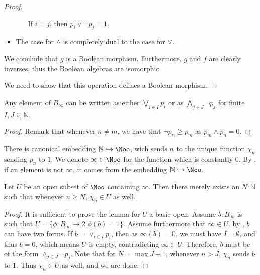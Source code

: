 \begin{proof}
\begin{itemize}
\begin{itemize}
        If $i = j$, then $p_i \vee \neg p_j = 1$.
%
%
      \end{itemize}
    \item The case for $\wedge$ is completely dual to the case for $\vee$. 
  \end{itemize}
We conclude that $g$ is a Boolean morphism. 
Furthermore, $g$ and $f$ are clearly inverses, thus the Boolean algebras are isomorphic. 


  We need to show that this operation defines a Boolean morphism. 



\end{proof}
  \begin{lemma}\label{lemBinftyNormalForm}
  Any element of $B_\infty$ can be written as 
  either $\bigvee_{i\in I} p_i$  or
  as $\bigwedge_{j\in J} \neg p_j$ 
  for finite $I,J\subseteq \mathbb N$. 
\end{lemma}
\begin{proof}
  Remark that whenever $n \neq m$, we have that 
  $\neg p_n \geq p_m$ as $p_m \wedge p_n = 0$. 
\end{proof}
There is canonical embedding $\mathbb N \hookrightarrow \Noo$, 
wich sends $n$ to the unique function $\chi_{n}$ sending $p_n$ to $1$. 
We denote $\infty \in \Noo$ for the function which is constantly $0$. 
By , if an element is not $\infty$, 
it comes from the embedding $\mathbb N \hookrightarrow \Noo$. 
\begin{lemma}\label{LemmaOpensContainingInfty}
  Let $U$ be an open subset of $\Noo$ containing $\infty$.
  Then there merely exists an $N:\mathbb N$ such that whenever $n\geq N$, 
  $\chi_n\in U$ as well. 
\end{lemma}
\begin{proof}
  It is sufficient to prove the lemma for $U$ a basic open. 
  Assume $b : B_\infty $ is such that 
  $U = \{ \phi: B_\infty \to 2| \phi(b) = 1\}$.
  Assume furthermore that $\infty \in U$.
  by , $b$ can have two forms.
  If $b = \vee_{i\in I} p_i$, then as $\infty(b) = 0$, 
  we must have $I = \emptyset$, and thus $b = 0$, 
  which means $U$ is empty, contradicting $\infty\in U$. 
  Therefore, 
  $b$ must be of the form $\wedge_{j \in J} \neg p_j$. 
  Note that for $N = \max J + 1$, whenever $n>J$, 
  $\chi_n$  sends $b$ to $1$. 
  Thus $\chi_n \in U$ as well, and we are done. 
\end{proof}

